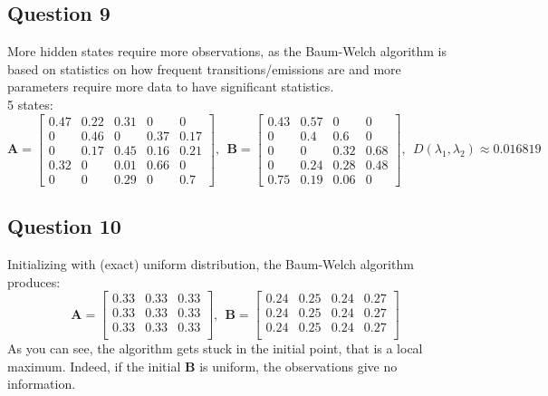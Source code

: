 \documentclass{scrartcl}
\begin{document}
\subsection{Question 9}

More hidden states require more observations, as the Baum-Welch algorithm is based on statistics on how frequent transitions/emissions are and more parameters require more data to have significant statistics. \\

5 states:
\begin{equation}
  \mathbf{A} = 
 \begin{bmatrix}
  0.47 & 0.22 & 0.31 & 0 & 0 \\
  0 & 0.46 & 0 & 0.37 & 0.17 \\
  0 & 0.17 & 0.45 & 0.16 & 0.21 \\
  0.32 & 0 & 0.01 & 0.66 & 0 \\
  0 & 0 & 0.29 & 0 & 0.7
 \end{bmatrix} 
 ,\ \ \mathbf{B} = 
 \begin{bmatrix}
  0.43 & 0.57 & 0 & 0 \\
  0 & 0.4 & 0.6 & 0 \\
  0 & 0 & 0.32 & 0.68 \\
  0 & 0.24 & 0.28 & 0.48 \\
  0.75 & 0.19 & 0.06 & 0
 \end{bmatrix} 
 ,\ \ D(\lambda_1, \lambda_2) \approx 0.016819
\end{equation}

\subsection{Question 10}

Initializing with (exact) uniform distribution, the Baum-Welch algorithm produces:
\begin{equation}
  \mathbf{A} = 
 \begin{bmatrix}
  0.33 & 0.33 & 0.33 \\
  0.33 & 0.33 & 0.33 \\
  0.33 & 0.33 & 0.33 \\
 \end{bmatrix} 
 ,\ \ \mathbf{B} = 
 \begin{bmatrix}
  0.24 & 0.25 & 0.24 & 0.27 \\
  0.24 & 0.25 & 0.24 & 0.27 \\
  0.24 & 0.25 & 0.24 & 0.27 \\
 \end{bmatrix}
\end{equation}
As you can see, the algorithm gets stuck in the initial point, that is a local maximum. Indeed, if the initial $\mathbf{B}$ is uniform, the observations give no information. \\
\end{document}
